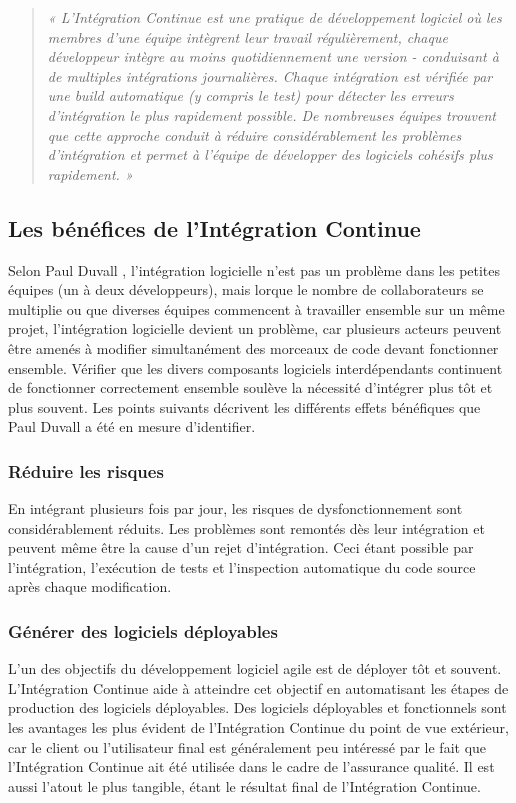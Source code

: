   \begin{quotation}
    \emph{« L'Intégration Continue est une pratique de développement logiciel où les membres d'une équipe intègrent leur travail régulièrement, chaque développeur intègre au moins quotidiennement une version - conduisant à de multiples intégrations journalières. Chaque intégration est vérifiée par une build automatique (y compris le test) pour détecter les erreurs d'intégration le plus rapidement possible. De nombreuses équipes trouvent que cette approche conduit à réduire considérablement les problèmes d'intégration et permet à l'équipe de développer des logiciels cohésifs plus rapidement. »}\\
  \end{quotation}

    \subsection{Les bénéfices de l’Intégration Continue}\label{Benefits}
    Selon Paul Duvall \cite{Duv07}, l'intégration logicielle n’est pas un problème dans les petites équipes (un à deux développeurs), mais lorque le nombre de collaborateurs se multiplie ou que diverses équipes commencent à travailler ensemble sur un même projet, l'intégration logicielle devient un problème, car plusieurs acteurs peuvent être amenés à modifier simultanément des morceaux de code devant fonctionner ensemble. Vérifier que les divers composants logiciels interdépendants continuent de fonctionner correctement ensemble soulève la nécessité d'intégrer plus tôt et plus souvent. Les points suivants décrivent les différents effets bénéfiques que Paul Duvall a été en mesure d'identifier.

      \subsubsection{Réduire les risques}
      En intégrant plusieurs fois par jour, les risques de dysfonctionnement sont considérablement réduits. Les problèmes sont remontés dès leur intégration et peuvent même être la cause d’un rejet d’intégration. Ceci étant possible par l’intégration, l’exécution de tests et l’inspection automatique du code source après chaque modification.

      \subsubsection{Générer des logiciels déployables}
      L'un des objectifs du développement logiciel agile est de déployer tôt et souvent. L’Intégration Continue aide à atteindre cet objectif en automatisant les étapes de production des logiciels déployables. Des logiciels déployables et fonctionnels sont les avantages les plus évident de l’Intégration Continue du point de vue extérieur, car le client ou l'utilisateur final est généralement peu intéressé par le fait que l’Intégration Continue ait été utilisée dans le cadre de l'assurance qualité. Il est aussi l'atout le plus tangible, étant le résultat final de l’Intégration Continue.

